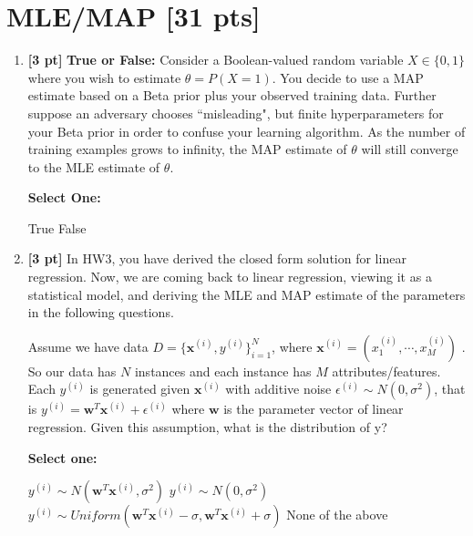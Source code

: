 \documentclass[11pt,addpoints,answers]{exam}
\begin{document}
\section{MLE/MAP [31 pts]}
\begin{enumerate}

    \item \textbf{[3 pt]} \textbf{True or False:} Consider a Boolean-valued random variable $X \in \{0,1\}$ where you wish to estimate $\theta = P(X=1)$.  You decide to use a MAP estimate based on a Beta prior plus your observed training data. Further suppose an adversary chooses ``misleading", but finite hyperparameters for your Beta prior in order to confuse your learning algorithm. As the number of training examples grows to infinity, the MAP estimate of $\theta$ will still converge to the MLE estimate of $\theta$.
    
    \textbf{Select One:}
    
    \begin{checkboxes}
        \choice True
        \choice False
    \end{checkboxes}
    
    
    
    \item \textbf{[3 pt]} In HW3, you have derived the closed form solution for linear regression. Now, we are coming back to linear regression, viewing it as a statistical model, and deriving the MLE and MAP estimate of the parameters in the following questions. 
    
    Assume we have data $D = \{\mathbf{x}^{(i)}, y^{(i)}\}_{i=1}^{N}$, where $\mathbf{x}^{(i)} = (x_1^{(i)}, \cdots, x_M^{(i)})$ . So our data has $N$  instances and each instance has $M$  attributes/features. Each $y^{(i)}$ is generated given $\mathbf{x}^{(i)}$ with additive noise $\epsilon^{(i)} \sim N(0, \sigma^2)$, that is $y^{(i)} = \mathbf{w}^T \mathbf{x}^{(i)} + \epsilon^{(i)}$ where $\mathbf{w}$  is the parameter vector of linear regression. Given this assumption, what is the distribution of y? 

    \textbf{Select one:}
    \begin{checkboxes}
        \choice $y^{(i)} \sim N(\mathbf{w}^T \mathbf{x}^{(i)}, \sigma^2)$
        \choice $y^{(i)} \sim N(0, \sigma^2)$
        \choice $y^{(i)} \sim \textit{Uniform}(\mathbf{w}^T \mathbf{x}^{(i)} - \sigma,  \mathbf{w}^T \mathbf{x}^{(i)} + \sigma)$
        \choice None of the above
    \end{checkboxes}
    

\end{enumerate}
\end{document}
